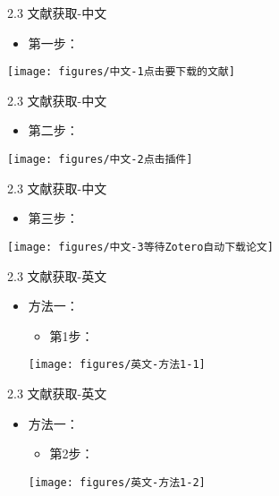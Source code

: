 \documentclass{beamer}%
\begin{document}
\begin{frame}[t]{2.3 文献获取-中文}
\begin{itemize}
\item 第一步：
\end{itemize}
\vspace{-0.4cm} %
\begin{center}
		\texttt{[image: figures/中文-1点击要下载的文献]}
\end{center}
\end{frame}

\begin{frame}[t]{2.3 文献获取-中文}
\begin{itemize}
\item 第二步：
\end{itemize}
\vspace{-0.4cm} %
\begin{center}
		\texttt{[image: figures/中文-2点击插件]}
\end{center}
\end{frame}

\begin{frame}[t]{2.3 文献获取-中文}
\begin{itemize}
\item 第三步：
\end{itemize}
\vspace{-0.4cm} %
\begin{center}
		\texttt{[image: figures/中文-3等待Zotero自动下载论文]}
\end{center}
\end{frame}

\begin{frame}[t]{2.3 文献获取-英文}
\begin{itemize}
  \item 方法一：
\begin{itemize}
\item 第1步：
\end{itemize}
\begin{center}
		\texttt{[image: figures/英文-方法1-1]}
\end{center}
\end{itemize}
\end{frame}

\begin{frame}[t]{2.3 文献获取-英文}
\begin{itemize}
  \item 方法一：
\begin{itemize}
\item 第2步：
\end{itemize}
\begin{center}
		\texttt{[image: figures/英文-方法1-2]}
\end{center}
\end{itemize}
\end{frame}
\end{document}
